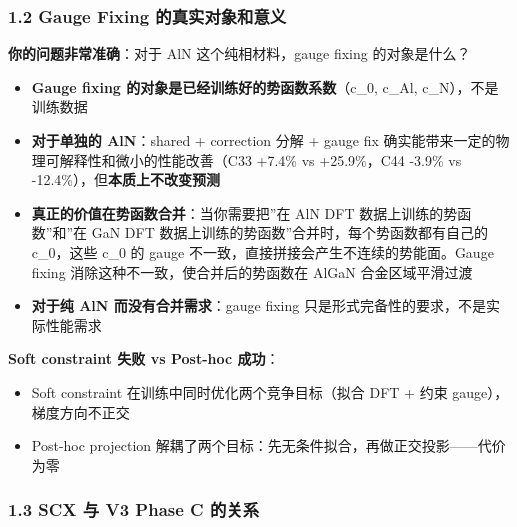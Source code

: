 \documentclass[
  12pt,
]{ctexart}
\providecommand{\tightlist}{%
  \setlength{\itemsep}{0pt}\setlength{\parskip}{0pt}}
\begin{document}
\subsubsection{1.2 Gauge Fixing
的真实对象和意义}\label{gauge-fixing-ux7684ux771fux5b9eux5bf9ux8c61ux548cux610fux4e49}

\textbf{你的问题非常准确}：对于 AlN 这个纯相材料，gauge fixing
的对象是什么？

\begin{itemize}
\tightlist
\item
  \textbf{Gauge fixing 的对象是已经训练好的势函数系数}（c\_0, c\_Al,
  c\_N），不是训练数据
\item
  \textbf{对于单独的 AlN}：shared + correction 分解 + gauge fix
  确实能带来一定的物理可解释性和微小的性能改善（C33 +7.4\% vs
  +25.9\%，C44 -3.9\% vs -12.4\%），但\textbf{本质上不改变预测}
\item
  \textbf{真正的价值在势函数合并}：当你需要把''在 AlN DFT
  数据上训练的势函数''和''在 GaN DFT
  数据上训练的势函数''合并时，每个势函数都有自己的 c\_0，这些 c\_0 的
  gauge 不一致，直接拼接会产生不连续的势能面。Gauge fixing
  消除这种不一致，使合并后的势函数在 AlGaN 合金区域平滑过渡
\item
  \textbf{对于纯 AlN 而没有合并需求}：gauge fixing
  只是形式完备性的要求，不是实际性能需求
\end{itemize}

\textbf{Soft constraint 失败 vs Post-hoc 成功}：

\begin{itemize}
\tightlist
\item
  Soft constraint 在训练中同时优化两个竞争目标（拟合 DFT + 约束
  gauge），梯度方向不正交
\item
  Post-hoc projection
  解耦了两个目标：先无条件拟合，再做正交投影------代价为零
\end{itemize}

\subsubsection{1.3 SCX 与 V3 Phase C
的关系}\label{scx-ux4e0e-v3-phase-c-ux7684ux5173ux7cfb}
\end{document}
